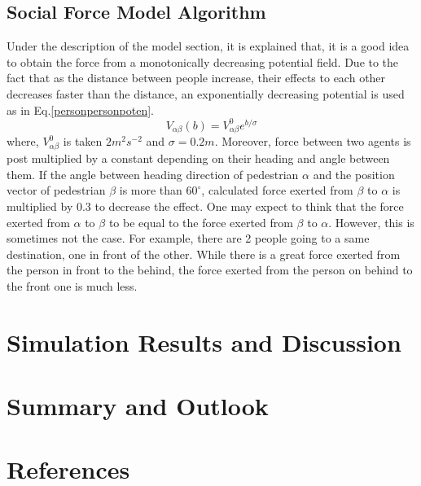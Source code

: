 \documentclass[11pt]{article}
\begin{document}
\subsection{Social Force Model Algorithm}
Under the description of the model section, it is explained that, it is a good idea to obtain the force from a monotonically decreasing potential field. Due to the fact that as the distance between people increase, their effects to each other decreases faster than the distance, an exponentially decreasing potential is used as in Eq.\ref{personpersonpoten}.
\begin{equation}
    V_{\alpha\beta}(b)=V^0_{\alpha\beta}e^{b/\sigma}
    \label{personpersonpoten}
\end{equation}
where, $V^0_{\alpha\beta}$ is taken $2m^2s^{-2}$ and $\sigma=0.2m$. Moreover, force between two agents is post multiplied by a constant depending on their heading and angle between them. If the angle between heading direction of pedestrian $\alpha$ and the position vector of pedestrian $\beta$ is more than $60^\circ$, calculated force exerted from $\beta$ to $\alpha$ is multiplied by 0.3 to decrease the effect. One may expect to think that the force exerted from $\alpha$ to $\beta$ to be equal to the force exerted from $\beta$ to $\alpha$. However, this is sometimes not the case. For example, there are 2 people going to a same destination, one in front of the other. While there is a great force exerted from the person in front to the behind, the force exerted from the person on behind to the front one is much less. 
\section{Simulation Results and Discussion}

\section{Summary and Outlook}

\section{References}







\end{document}
